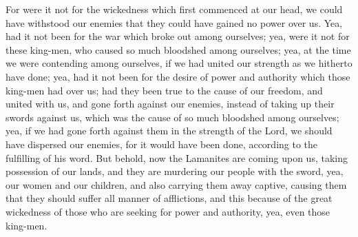 For were it not for the wickedness which first commenced at our head, we could have withstood our enemies that they could have gained no power over us.
\bverse \iffalse Yea, had it not been for the war which broke out among ourselves; yea, were it not for these king-men, who caused so much bloodshed among ourselves; yea, at the time we were contending among ourselves, if we had united our strength as we hitherto have done; yea, had it not been for the desire of power and authority which those king-men had over us; had they been true to the cause of our freedom, and united with us, and gone forth against our enemies, instead of taking up their swords against us, which was the cause of so much bloodshed among ourselves; yea, if we had gone forth against them in the strength of the Lord, we should have dispersed our enemies, for it would have been done, according to the fulfilling of his word. \fi
Yea, had it not been for the war which broke out among ourselves; yea, were it not for these king-men, who caused so much bloodshed among ourselves; yea, at the time we were contending among ourselves, if we had united our strength as we hitherto have done; yea, had it not been for the desire of power and authority which those king-men had over us; had they been true to the cause of our freedom, and united with us, and gone forth against our enemies, instead of taking up their swords against us, which was the cause of so much bloodshed among ourselves; yea, if we had gone forth against them in the strength of the Lord, we should have dispersed our enemies, for it would have been done, according to the fulfilling of his word.
\bverse \iffalse But behold, now the Lamanites are coming upon us, taking possession of our lands, and they are murdering our people with the sword, yea, our women and our children, and also carrying them away captive, causing them that they should suffer all manner of afflictions, and this because of the great wickedness of those who are seeking for power and authority, yea, even those king-men. \fi
But behold, now the Lamanites are coming upon us, taking possession of our lands, and they are murdering our people with the sword, yea, our women and our children, and also carrying them away captive, causing them that they should suffer all manner of afflictions, and this because of the great wickedness of those who are seeking for power and authority, yea, even those king-men.
\bverse \iffalse But why should I say much concerning this matter? For we know not but what ye yourselves are seeking for authority. We know not but what ye are also traitors to your country. \fi
